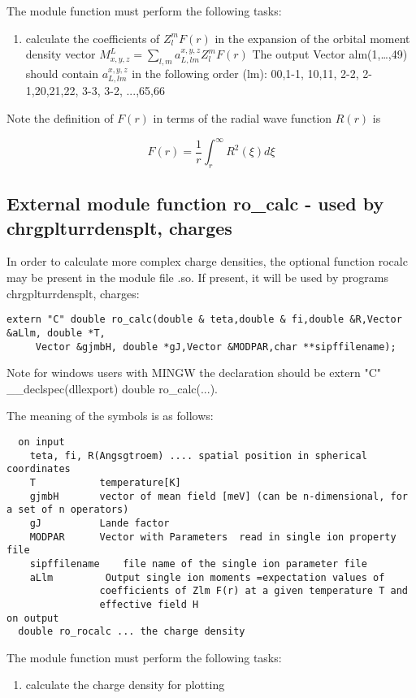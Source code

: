 The module function must perform the following tasks:
\begin{enumerate}
\item calculate the coefficients of $Z_l^m F(r)$ in the expansion of
      the orbital moment
      density vector $M^L_{x,y,z}=\sum_{l,m} a^{x,y,z}_{L,lm} Z_l^m F(r)$
      The output Vector alm(1,\dots,49) should contain  $a^{x,y,z}_{L,lm}$
      in the following order (lm):  00,1-1, 10,11, 2-2, 2-1,20,21,22, 3-3, 3-2, ...,65,66
\end{enumerate}

Note the definition of $F(r)$ in terms of the radial wave function $R(r)$ is

\begin{equation}
F(r)=\frac{1}{r}\int_r^{\infty} R^2(\xi)d\xi
\end{equation}

\subsection{External module function {\prg ro\_calc} -
used by {\prg chrgplturrdensplt},
{\prg charges}
}

In order to calculate more complex charge densities, the optional function
{\prg rocalc} may be present in the module file {\prg *.so}. If present,
it will be used by programs {\prg chrgplturrdensplt},
{\prg charges}:

\begin{verbatim}
extern "C" double ro_calc(double & teta,double & fi,double &R,Vector &aLlm, double *T,
     Vector &gjmbH, double *gJ,Vector &MODPAR,char **sipffilename);
\end{verbatim}

Note for windows users with MINGW the declaration should be {\prg extern "C" \_\_declspec(dllexport) double %
ro\_calc(...)}.

The meaning of the symbols is as follows:
{\footnotesize
\begin{verbatim}
  on input
    teta, fi, R(Angsgtroem) .... spatial position in spherical coordinates
    T           temperature[K]
    gjmbH       vector of mean field [meV] (can be n-dimensional, for a set of n operators)
    gJ          Lande factor
    MODPAR      Vector with Parameters  read in single ion property file
    sipffilename    file name of the single ion parameter file
    aLlm         Output single ion moments =expectation values of
                coefficients of Zlm F(r) at a given temperature T and
                effective field H
on output
  double ro_rocalc ... the charge density
\end{verbatim}
}

The module function must perform the following tasks:
\begin{enumerate}
\item calculate the charge density for plotting
\end{enumerate}


